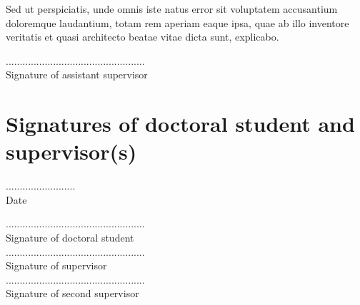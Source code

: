 
Sed ut perspiciatis, unde omnis iste natus error sit voluptatem accusantium doloremque laudantium, totam rem aperiam eaque ipsa, quae ab illo inventore veritatis et quasi architecto beatae vitae dicta sunt, explicabo.

\hfill\begin{minipage}{.5\textwidth}
    \centering
    \vspace{0.5in}
    .................................................. \\
    \small{Signature of assistant supervisor}
\end{minipage}


\section{Signatures of doctoral student and supervisor(s)}

\begin{minipage}[t]{.5\textwidth}
    \centering
    \vspace{0.5in}
    ......................... \\
    \small{Date} \\
\end{minipage} %
\begin{minipage}[t]{.5\textwidth}
    \centering
    \vspace{0.5in}
    .................................................. \\
    \small{Signature of doctoral student} \\
    \vspace{0.5in}
    .................................................. \\
    \small{Signature of supervisor} \\
    \vspace{0.5in}
    .................................................. \\
    \small{Signature of second supervisor}
\end{minipage}

